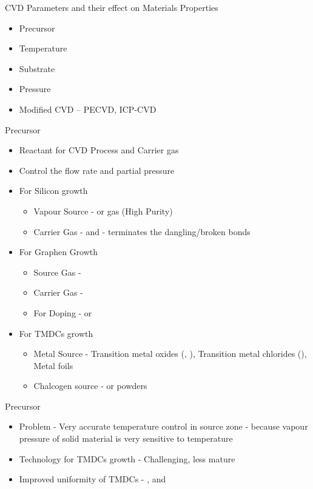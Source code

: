 \documentclass{beamer}
\begin{document}
\begin{frame}{CVD Parameters and their effect on Materials Properties}
    \begin{itemize}
        \item Precursor
        \item Temperature
        \item Substrate
        \item Pressure
        \item Modified CVD -- PECVD, ICP-CVD
    \end{itemize}
\end{frame}

\begin{frame}{Precursor}
    \begin{itemize}
        \item Reactant for CVD Process and Carrier gas
        \item Control the flow rate and partial pressure
        \item For Silicon growth
        \begin{itemize}
            \item Vapour Source -  or  gas (High Purity)
            \item Carrier Gas -  and  -  terminates the dangling/broken bonds
        \end{itemize}
        \item For Graphen Growth
        \begin{itemize}
            \item Source Gas - 
            \item Carrier Gas - 
            \item For Doping -  or 
        \end{itemize}
        \item For TMDCs growth
        \begin{itemize}
            \item Metal Source - Transition metal oxides (, ), Transition metal chlorides (), Metal foils
            \item Chalcogen source -  or  powders
        \end{itemize}
    \end{itemize}
\end{frame}

\begin{frame}{Precursor}
    \begin{itemize}
        \item Problem - Very accurate temperature control in source zone - because vapour pressure of solid material is very sensitive to temperature
        \item Technology for TMDCs growth - Challenging, less mature
        \item Improved uniformity of TMDCs - ,  and 
    \end{itemize}
\end{frame}
\end{document}
